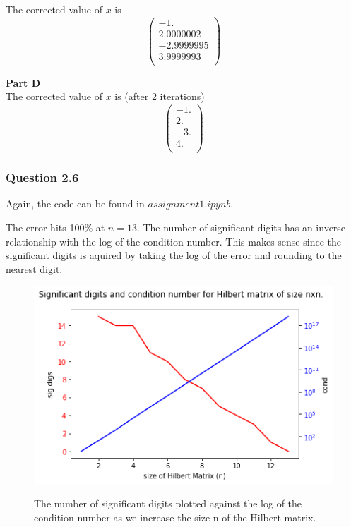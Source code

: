 \documentclass{article}
\begin{document}
The corrected value of $x$ is
$$\left( \begin{smallmatrix}
	-1.\\
 2.0000002\\
-2.9999995\\
 3.9999993\\
  \end{smallmatrix}
 \right)
$$

\textbf{Part D}\\
The corrected value of $x$ is (after 2 iterations)
$$\left( \begin{smallmatrix}
	-1.\\
 2.\\
-3.\\
 4.\\
  \end{smallmatrix}
 \right)
$$


\subsubsection{Question 2.6}
Again, the code can be found in $assignment1.ipynb$.

The error hits 100\% at $n=13$. The number of significant digits has an
inverse relationship with the log of the condition number. This makes
sense since the significant digits is aquired by taking the log of the error and
rounding to the nearest digit.

\begin{figure}[H]
	\includegraphics[width=\textwidth]{cond_and_sigdigits.png} 
	\label{fig:q2_6CP}
	\caption{The number of significant digits plotted against the log of the condition number as we increase the size n of the Hilbert matrix.}
\end{figure}
\end{document}
